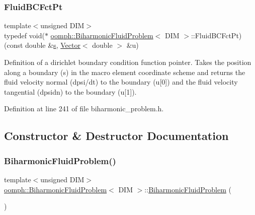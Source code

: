\subsubsection{\texorpdfstring{Fluid\+B\+C\+Fct\+Pt}{FluidBCFctPt}}
{\footnotesize\ttfamily template$<$unsigned D\+IM$>$ \\
typedef void($\ast$ \hyperlink{classoomph_1_1BiharmonicFluidProblem}{oomph\+::\+Biharmonic\+Fluid\+Problem}$<$ D\+IM $>$\+::Fluid\+B\+C\+Fct\+Pt) (const double \&\hyperlink{cfortran_8h_ab7123126e4885ef647dd9c6e3807a21c}{s}, \hyperlink{classoomph_1_1Vector}{Vector}$<$ double $>$ \&u)}



Definition of a dirichlet boundary condition function pointer. Takes the position along a boundary (s) in the macro element coordinate scheme and returns the fluid velocity normal (dpsi/dt) to the boundary (u\mbox{[}0\mbox{]}) and the fluid velocity tangential (dpsidn) to the boundary (u\mbox{[}1\mbox{]}). 



Definition at line 241 of file biharmonic\+\_\+problem.\+h.



\subsection{Constructor \& Destructor Documentation}
\mbox{\label{classoomph_1_1BiharmonicFluidProblem_a258f8f42491569c4727c54cd8f8f17d5}} 
\subsubsection{\texorpdfstring{Biharmonic\+Fluid\+Problem()}{BiharmonicFluidProblem()}}
{\footnotesize\ttfamily template$<$unsigned D\+IM$>$ \\
\hyperlink{classoomph_1_1BiharmonicFluidProblem}{oomph\+::\+Biharmonic\+Fluid\+Problem}$<$ D\+IM $>$\+::\hyperlink{classoomph_1_1BiharmonicFluidProblem}{Biharmonic\+Fluid\+Problem} (\begin{DoxyParamCaption}{ }\end{DoxyParamCaption})\hspace{0.3cm}{\ttfamily [inline]}}



